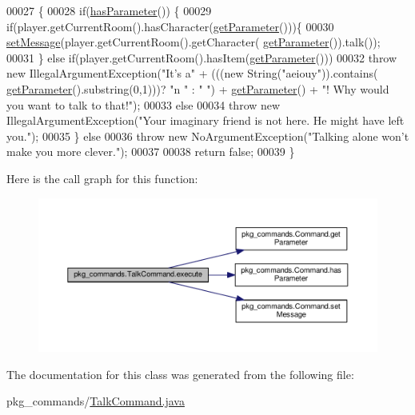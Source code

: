 \begin{DoxyCode}
00027                                                                                               \{
00028         \textcolor{keywordflow}{if}(\hyperlink{classpkg__commands_1_1Command_a02af95ab3f1898a66259ab7c177b6998}{hasParameter}()) \{
00029             \textcolor{keywordflow}{if}(player.getCurrentRoom().hasCharacter(\hyperlink{classpkg__commands_1_1Command_a41c92d445be73ea9d62320c65efb8434}{getParameter}()))\{
00030                 \hyperlink{classpkg__commands_1_1Command_ae210ff216fe908b111ba1c988a963d13}{setMessage}(player.getCurrentRoom().getCharacter(
      \hyperlink{classpkg__commands_1_1Command_a41c92d445be73ea9d62320c65efb8434}{getParameter}()).talk());
00031             \} \textcolor{keywordflow}{else} \textcolor{keywordflow}{if}(player.getCurrentRoom().hasItem(\hyperlink{classpkg__commands_1_1Command_a41c92d445be73ea9d62320c65efb8434}{getParameter}()))
00032                 \textcolor{keywordflow}{throw} \textcolor{keyword}{new} IllegalArgumentException(\textcolor{stringliteral}{"It's a"} + (((\textcolor{keyword}{new} String(\textcolor{stringliteral}{"aeiouy"})).contains(
      \hyperlink{classpkg__commands_1_1Command_a41c92d445be73ea9d62320c65efb8434}{getParameter}().substring(0,1)))? \textcolor{stringliteral}{"n "} : \textcolor{stringliteral}{" "}) + \hyperlink{classpkg__commands_1_1Command_a41c92d445be73ea9d62320c65efb8434}{getParameter}() + \textcolor{stringliteral}{"! Why would you
       want to talk to that!"});
00033             \textcolor{keywordflow}{else}
00034                 \textcolor{keywordflow}{throw} \textcolor{keyword}{new} IllegalArgumentException(\textcolor{stringliteral}{"Your imaginary friend is not here. He might have left
       you."});
00035         \} \textcolor{keywordflow}{else}
00036             \textcolor{keywordflow}{throw} \textcolor{keyword}{new} NoArgumentException(\textcolor{stringliteral}{"Talking alone won't make you more clever."});
00037 
00038         \textcolor{keywordflow}{return} \textcolor{keyword}{false};
00039     \}
\end{DoxyCode}


Here is the call graph for this function\-:\nopagebreak
\begin{figure}[H]
\begin{center}
\leavevmode
\includegraphics[width=350pt]{classpkg__commands_1_1TalkCommand_a413573388e24a2d442f9814695f7e47c_cgraph}
\end{center}
\end{figure}




The documentation for this class was generated from the following file\-:\begin{DoxyCompactItemize}
\item 
pkg\-\_\-commands/\hyperlink{TalkCommand_8java}{Talk\-Command.\-java}\end{DoxyCompactItemize}
